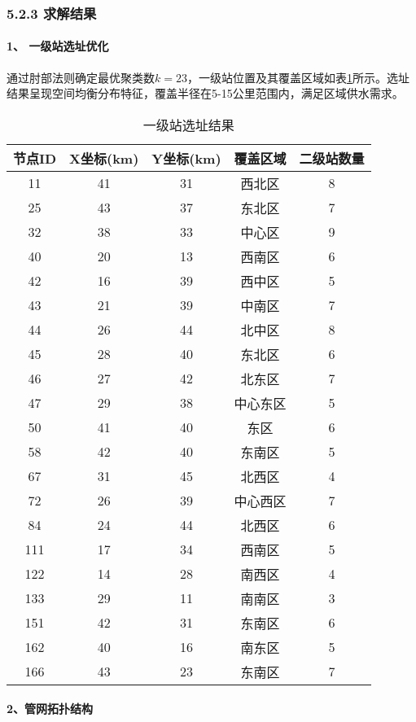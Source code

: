 \documentclass[12pt,a4paper]{article}
\begin{document}
\subsubsection*{5.2.3 求解结果}
\paragraph{1、 一级站选址优化}
通过肘部法则确定最优聚类数$k=23$，一级站位置及其覆盖区域如表\ref{tab:primary_stations}所示。选址结果呈现空间均衡分布特征，覆盖半径在5-15公里范围内，满足区域供水需求。

\begin{table}[H]
\centering
\caption{一级站选址结果}
\label{tab:primary_stations}
\begin{tabular}{|c|c|c|c|c|}
\hline
\textbf{节点ID} & \textbf{X坐标(km)} & \textbf{Y坐标(km)} & \textbf{覆盖区域} & \textbf{二级站数量} \\
\hline
11 & 41 & 31 & 西北区 & 8 \\
25 & 43 & 37 & 东北区 & 7 \\
32 & 38 & 33 & 中心区 & 9 \\
40 & 20 & 13 & 西南区 & 6 \\
42 & 16 & 39 & 西中区 & 5 \\
43 & 21 & 39 & 中南区 & 7 \\
44 & 26 & 44 & 北中区 & 8 \\
45 & 28 & 40 & 东北区 & 6 \\
46 & 27 & 42 & 北东区 & 7 \\
47 & 29 & 38 & 中心东区 & 5 \\
50 & 41 & 40 & 东区 & 6 \\
58 & 42 & 40 & 东南区 & 5 \\
67 & 31 & 45 & 北西区 & 4 \\
72 & 26 & 39 & 中心西区 & 7 \\
84 & 24 & 44 & 北西区 & 6 \\
111 & 17 & 34 & 西南区 & 5 \\
122 & 14 & 28 & 南西区 & 4 \\
133 & 29 & 11 & 南南区 & 3 \\
151 & 42 & 31 & 东南区 & 6 \\
162 & 40 & 16 & 南东区 & 5 \\
166 & 43 & 23 & 东南区 & 7 \\
\hline
\end{tabular}
\end{table}

\paragraph{2、管网拓扑结构}
\end{document}
